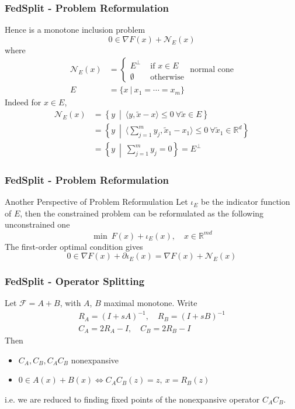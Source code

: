 
\begin{frame}
\frametitle{FedSplit - Problem Reformulation}

Hence is a monotone inclusion problem
$$0 \in \nabla F(x) + \mathcal{N}_E(x)$$
where
\begin{align*}
\mathcal{N}_E(x) & = \begin{cases} E^{\perp} & \text{ if } x \in E \\ \emptyset & \text{ otherwise } \end{cases} \text{normal cone} \\
E & = \{x \ |\ x_1 = \cdots = x_m\}
\end{align*}
Indeed for $x\in E$,
\begin{align*}
\mathcal{N}_E(x) & = \left\{ y \ \middle|\ \langle y, \widetilde{x} - x \rangle \leqslant 0 \ \forall \widetilde{x} \in E \right\} \\
& = \left\{ y \ \middle|\ \langle \sum\nolimits_{j=1}^m y_j, \widetilde{x}_1 - x_1 \rangle \leqslant 0 \ \forall \widetilde{x}_1 \in \mathbb{R}^d \right\} \\
& = \left\{ y \ \middle|\ \sum\nolimits_{j=1}^m y_j = 0 \right\} = E^{\perp}
\end{align*}

\end{frame}


\begin{frame}
\frametitle{FedSplit - Problem Reformulation}

\begin{block}{Another Perspective of Problem Reformulation}
Let $\iota_E$ be the indicator function of $E$, then the constrained problem can be reformulated as the following unconstrained one
$$\min \ F(x) + \iota_E(x), \quad x \in \mathbb{R}^{md}$$
The first-order optimal condition gives
$$0 \in \nabla F(x) + \partial \iota_E(x) = \nabla F(x) + \mathcal{N}_E(x)$$
\end{block}

\end{frame}


\begin{frame}
\frametitle{FedSplit - Operator Splitting}

Let $\mathcal{F} = A+B$, with $A$, $B$ maximal monotone. Write
\begin{gather*}
R_A = (I + s A)^{-1}, \quad R_B = (I + s B)^{-1} \\
C_A = 2R_A - I, \quad C_B = 2R_B - I
\end{gather*}
Then
\begin{itemize}
    \item $C_A, C_B, C_AC_B$ nonexpansive
    \item $0\in A(x)+B(x) \Longleftrightarrow C_AC_B(z) = z, \ x = R_B(z)$
\end{itemize}
i.e. we are reduced to finding fixed points of the nonexpansive operator $ C_AC_B$.

\end{frame}

